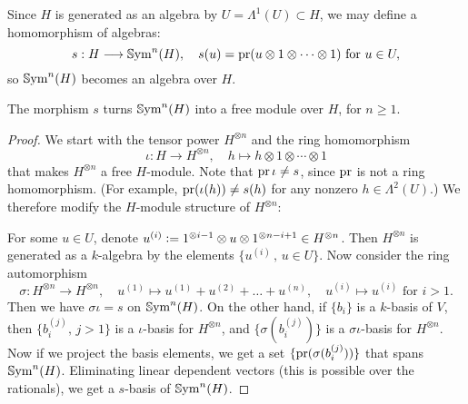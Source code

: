 Since $H$ is generated as an algebra by $U=\Lambda^1(U)\subset H$, we may define a homomorphism of algebras:
$$ s : H \longrightarrow \operatorname{\mathbb{S}ym}^n( H), \quad s(u) = \operatorname{pr}( u \otimes 1\otimes\cdots\otimes 1)\text{ for }u\in U, $$
so $\operatorname{\mathbb{S}ym}^n( H)$ becomes an algebra over $H$.
\begin{lemma}
\label{SuperFree}
The morphism $s$ turns $\operatorname{\mathbb{S}ym}^n( H)$ into a free module over $H$, for $n\geq 1$.
\end{lemma}
\begin{proof}
We start with the tensor power $H^{\otimes n}$ and the ring homomorphism 
$$
\iota : H \longrightarrow H^{\otimes n},\quad h\longmapsto h\otimes 1\otimes\cdots\otimes 1
$$
that makes $H^{\otimes n}$ a free $H$-module. Note that $\operatorname{pr} \iota \neq s$, since $\operatorname{pr}$ is not a ring homomorphism.
(For example, $\operatorname{pr}(\iota(h))\neq s(h)$ for any nonzero $h\in\Lambda^2(U)$.)
We therefore modify the $H$-module structure of $H^{\otimes n}$:

For some $u\in U$, denote $u^{(i)} \vcentcolon=  1^{\otimes i-1}\otimes u\otimes 1^{\otimes n-i+1} \in H^{\otimes n}$. Then $H^{\otimes n}$ is generated as a $k$-algebra by the elements $\{u^{(i)}\,,\,u\in U\}$. Now consider the ring automorphism
$$
\sigma : H^{\otimes n} \longrightarrow H^{\otimes n}, \quad u^{(1)} \longmapsto u^{(1)} +u^{(2)} + \ldots + u^{(n)}, \quad
u^{(i)} \longmapsto u^{(i)} \text{ for } i>1.
$$
Then we have $\sigma\iota = s$ on $\operatorname{\mathbb{S}ym}^n( H)$. On the other hand, if $\{b_i\}$ is a $k$-basis of $V$, then $\{b_i^{(j)},\,j>1\} $ is a $\iota$-basis for $H^{\otimes n}$, and $\{\sigma(b_i^{(j)})\}$ is a $\sigma\iota$-basis for $H^{\otimes n}$.
Now if we project the basis elements, we get a set $\{\operatorname{pr}(\sigma(b_i^{(j)}))\}$ that spans $\operatorname{\mathbb{S}ym}^n( H)$. Eliminating linear dependent vectors (this is possible over the rationals), we get a $s$-basis of $\operatorname{\mathbb{S}ym}^n( H)$.
\end{proof}


